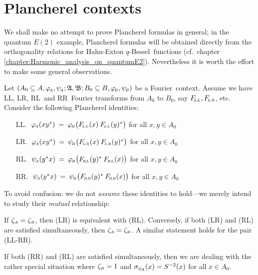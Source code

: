 
\section{Plancherel contexts}


\begin{abs_chp}
We shall make no attempt to prove Plancherel formulas in general;
in the quantum $E(2)$ example, Plancherel formulas will be obtained
directly from the orthogonality relations for Hahn-Exton \mbox{$q$-Bessel}\ functions
(cf.\ chapter \ref{chapter:Harmonic_analysis_on_quantumE2}).
Nevertheless it is worth the effort to make some general observations.
\end{abs_chp}



\begin{lemma_sec}  \label{lemma:Plancherel}
Let $ (A_0 \subseteq A, \varphi_{\!\scriptscriptstyle A}, \psi_{\!\scriptscriptstyle A}; \mathfrak A, \mathfrak B; B_0 \subseteq B, \varphi_{\scriptscriptstyle \! B}, \psi_{\scriptscriptstyle \! B} )$ be a \mbox{Fourier context}\@.
Assume we have {\scriptsize LL}, {\scriptsize LR}, {\scriptsize RL}\ and {\scriptsize RR}\
Fourier transforms from\/ $A_0$ to\/ $B_0$, say\/ $F_{\!\scriptscriptstyle LL}, F_{\!\scriptscriptstyle LR}$, etc\@.
Consider the following Plancherel identities:
\begin{enumerate}
\item[\scriptsize LL.]
    $\;\phiA(x y^*) \:=\: \phiB \!\left(\FLL(x)\: \FLL(y)^* \vertM \right)$
    for all\/ $x, y \in A_0$
\item[\scriptsize LR.]
    $\;\phiA(x y^*) \:=\: \psiB \!\left(\FLR(x)\: \FLR(y)^* \vertM  \right)$
    for all\/ $x, y \in A_0$
\item[\scriptsize RL.]
    $\;\psiA(y^* x) \:=\: \phiB \!\left(\FRL(y)^* \:\FRL(x) \vertM   \right)$
    for all\/ $x, y \in A_0$
\item[\scriptsize RR.]
    $\;\psiA(y^* x) \:=\: \psiB \!\left(\FRR(y)^* \: \FRR(x) \vertM  \right)$
    for all\/ $x, y \in A_0$
\end{enumerate}
{\rm To avoid confusion: we do not {\em assume\/} these identities to hold---we merely
intend to study their {\em mutual\/} relationship:}
\vspace{1ex}

If\/ $\zeta_{\scriptscriptstyle A}=\zeta_{\scriptscriptstyle B}$, then ({\scriptsize LR}) is equivalent with ({\scriptsize RL}).
Conversely, if both ({\scriptsize LR}) and ({\scriptsize RL}) are satisfied simultaneously,
then\/ $\zeta_{\scriptscriptstyle A}=\zeta_{\scriptscriptstyle B}$. A similar statement holds for the pair
({\scriptsize LL}-{\scriptsize RR}).
\vspace{1ex}

If both ({\scriptsize RR}) and ({\scriptsize RL}) are satisfied simultaneously,
then we are dealing with the rather special situation where\/ $\zeta_{\scriptscriptstyle B}=1$
and\/ $\sigma_{\psi_{\!\scriptscriptstyle A}}(x)= S^{-2}(x)$ for all $x \in A_0$.
\end{lemma_sec}

